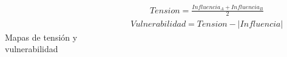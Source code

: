 \documentclass[bigger]{beamer}
\begin{document}
\begin{frame}
\frametitle{\secname} %
\framesubtitle{\subsecname} %
\rmfamily %
\color{black} %
\begin{columns}
\begin{figure}
    \centering
     \\
    \caption{Mapas de tensión y vulnerabilidad}
\end{figure}
\begin{gather*}
    Tension = \frac{Influencia_A + Influencia_B}{2}
\end{gather*}
\vspace{1.5cm}
\begin{gather*}
    Vulnerabilidad = Tension - \lvert Influencia \rvert
\end{gather*}
\vspace{0.6cm}
\end{columns}
\end{frame}
\end{document}
